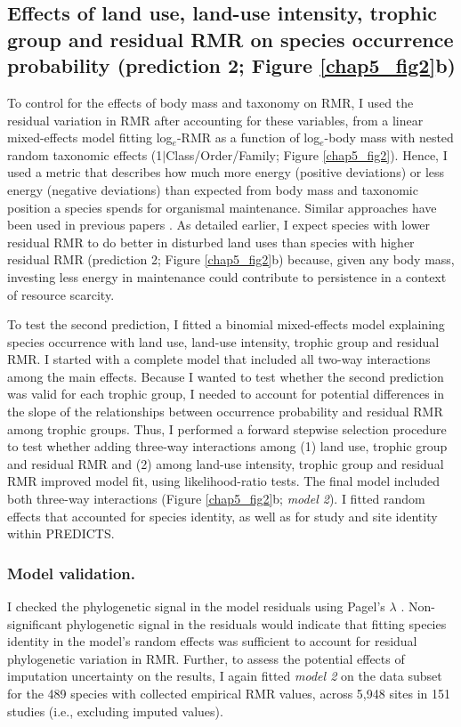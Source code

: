 \subsection{Effects of land use, land-use intensity, trophic group and residual RMR on species occurrence probability (prediction 2; Figure \ref{chap5_fig2}b)}

To control for the effects of body mass and taxonomy on RMR, I used the residual variation in RMR after accounting for these variables, from a linear mixed-effects model fitting log$_e$-RMR as a function of log$_e$-body mass with nested random taxonomic effects (1$\mid$Class/Order/Family; Figure \ref{chap5_fig2}). Hence, I used a metric that describes how much more energy (positive deviations) or less energy (negative deviations) than expected from body mass and taxonomic position a species spends for organismal maintenance. Similar approaches have been used in previous papers \citep{Furness2008, Naya2013}. As detailed earlier, I expect species with lower residual RMR to do better in disturbed land uses than species with higher residual RMR (prediction 2; Figure \ref{chap5_fig2}b) because, given any body mass, investing less energy in maintenance could contribute to persistence in a context of resource scarcity. 

To test the second prediction, I fitted a binomial mixed-effects model explaining species occurrence with land use, land-use intensity, trophic group and residual RMR. I started with a complete model that included all two-way interactions among the main effects. Because I wanted to test whether the second prediction was valid for each trophic group, I needed to account for potential differences in the slope of the relationships between occurrence probability and residual RMR among trophic groups. Thus, I performed a forward stepwise selection procedure to test whether adding three-way interactions among (1) land use, trophic group and residual RMR and (2) among land-use intensity, trophic group and residual RMR improved model fit, using likelihood-ratio tests. The final model included both three-way interactions (Figure \ref{chap5_fig2}b; \textit{model 2}). I fitted random effects that accounted for species identity, as well as for study and site identity within PREDICTS.  

\subsubsection*{Model validation.}
I checked the phylogenetic signal in the model residuals using Pagel’s $\lambda$ \citep{Pagel1999}. Non-significant phylogenetic signal in the residuals would indicate that fitting species identity in the model’s random effects was sufficient to account for residual phylogenetic variation in RMR. Further, to assess the potential effects of imputation uncertainty on the results, I again fitted \textit{model 2} on the data subset for the 489 species with collected empirical RMR values, across 5,948 sites in 151 studies (i.e., excluding imputed values).  



